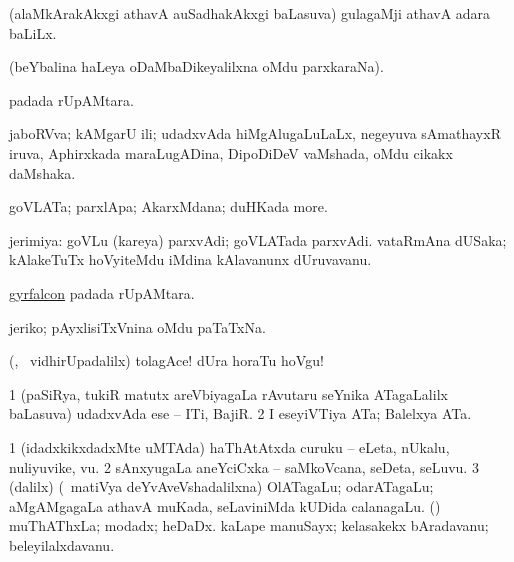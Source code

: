 \bentry
{}
\gl{\nA}
\bmng
(alaMkArakAkxgi athavA auSadhakAkxgi baLasuva) gulagaMji athavA adara baLiLx. 
\emng
\eentry

\bentry
{}
\gl{\saMkiSx}
\bmng
{} (beYbalina haLeya oDaMbaDikeyalilxna oMdu parxkaraNa). 
\emng
\eentry

\bentry
{}
\gl{\nA}
\bmng
{} padada rUpAMtara. 
\emng
\eentry

\bentry
{}
\gl{\nA}
\bmng
jaboRVva; kAMgarU ili; udadxvAda hiMgAlugaLuLaLx, negeyuva sAmathayxR iruva, Aphirxkada maraLugADina, DipoDiDeV vaMshada, oMdu cikakx daMshaka.   
\emng
\eentry

\bentry
{}
\gl{\nA}
\bmng
goVLATa; parxlApa; AkarxMdana; duHKada more. 
\emng
\eentry

\bentry
{}
\gl{\nA}
\bmng
jerimiya: 
\banum
{} goVLu (kareya) parxvAdi; goVLATada parxvAdi. 
 vataRmAna dUSaka; kAlakeTuTx hoVyiteMdu iMdina kAlavanunx dUruvavanu. 
\eanum
\emng
\eentry

\bentry
{}
\gl{\nA}
\bmng
\hyperref{kandict_g.pdf}{G}{gyrfalcon}{gyrfalcon} padada rUpAMtara. 
\emng
\eentry

\bentry
{}
\gl{\nA}
\bmng
jeriko; pAyxlisiTxVnina oMdu paTaTxNa. 
\emng

\noindent
\gl{\nuga}
\bmng
{} (\AmA, \kanmu\ vidhirUpadalilx) tolagAce! dUra horaTu hoVgu! 
\emng
\eentry

\bentry
{}
\gl{\nA}
\bmng
\bnum
\num{1} (paSiRya, tukiR matutx areVbiyagaLa rAvutaru seYnika ATagaLalilx baLasuva) udadxvAda ese -- ITi, BajiR. 
\num{2} I eseyiVTiya ATa; Balelxya ATa. 
\enum
\emng
\eentry

\bentry
{}
\gl{\nA}
\bmng
\bnum
\num{1} (idadxkikxdadxMte uMTAda) haThAtAtxda curuku -- eLeta, nUkalu, nuliyuvike, \mo vu. 
\num{2} sAnxyugaLa aneYciCxka -- saMkoVcana, seDeta, seLuvu. 
\num{3} (\bava dalilx) (\kanmu\ matiVya deYvAveVshadalilxna) OlATagaLu; odarATagaLu; aMgAMgagaLa athavA muKada, seLaviniMda kUDida calanagaLu. 
 (\ashi) 
\banum
{} muThAThxLa; modadx; heDaDx. 
 kaLape manuSayx; kelasakekx bAradavanu; beleyilalxdavanu. 
\eanum
\numie
\enum
\emng
\eentry

